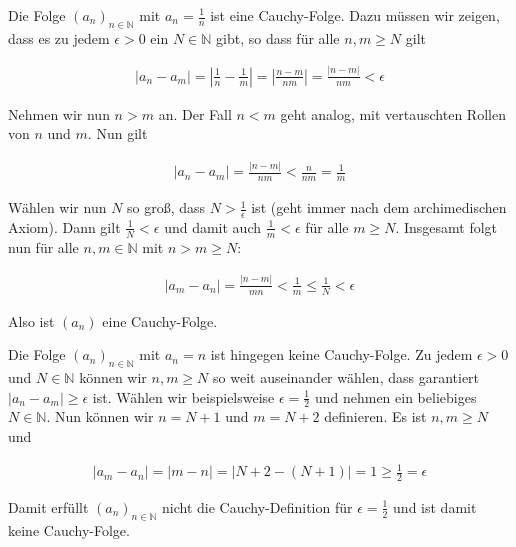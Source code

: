 \documentclass[fontsize=9pt,
               parskip=half-,
               DIV=14,
               listof=chapterentry,
               tocflat]{scrbook}
\begin{document}
\begin{example*}
Die Folge $(a_{n})_{n\in \mathbb {N} }$ mit $a_{n}={\tfrac {1}{n}}$ ist eine Cauchy-Folge. Dazu müssen wir zeigen, dass es zu jedem $\epsilon >0$ ein $N\in \mathbb {N} $ gibt, so dass für alle $n,m\geq N$ gilt

\begin{align*}
|a_{n}-a_{m}|=\left|{\frac {1}{n}}-{\frac {1}{m}}\right|=\left|{\frac {n-m}{nm}}\right|={\frac {|n-m|}{nm}}<\epsilon 
\end{align*}

Nehmen wir nun $n>m$ an. Der Fall $n<m$ geht analog, mit vertauschten Rollen von $n$ und $m$. Nun gilt

\begin{align*}
|a_{n}-a_{m}|={\frac {|n-m|}{nm}}<{\frac {n}{nm}}={\frac {1}{m}}
\end{align*}

Wählen wir nun $N$ so groß, dass $N>{\tfrac {1}{\epsilon }}$ ist (geht immer nach dem archimedischen Axiom). Dann gilt ${\tfrac {1}{N}}<\epsilon $ und damit auch ${\tfrac {1}{m}}<\epsilon $ für alle $m\geq N$. Insgesamt folgt nun für alle $n,m\in \mathbb {N} $ mit $n>m\geq N$:

\begin{align*}
|a_{m}-a_{n}|={\frac {|n-m|}{mn}}<{\frac {1}{m}}\leq {\frac {1}{N}}<\epsilon 
\end{align*}

Also ist $(a_{n})$ eine Cauchy-Folge.

\end{example*}

\begin{example*}
Die Folge $(a_{n})_{n\in \mathbb {N} }$ mit $a_{n}=n$ ist hingegen keine Cauchy-Folge. Zu jedem $\epsilon >0$ und $N\in \mathbb {N} $ können wir $n,m\geq N$ so weit auseinander wählen, dass garantiert $|a_{n}-a_{m}|\geq \epsilon $ ist. Wählen wir beispielsweise $\epsilon ={\tfrac {1}{2}}$ und nehmen ein beliebiges $N\in \mathbb {N} $. Nun können wir $n=N+1$ und $m=N+2$ definieren. Es ist $n,m\geq N$ und

\begin{align*}
|a_{m}-a_{n}|=|m-n|=|N+2-(N+1)|=1\geq {\tfrac {1}{2}}=\epsilon 
\end{align*}

Damit erfüllt $(a_{n})_{n\in \mathbb {N} }$ nicht die Cauchy-Definition für $\epsilon ={\tfrac {1}{2}}$ und ist damit keine Cauchy-Folge.

\end{example*}
\end{document}
